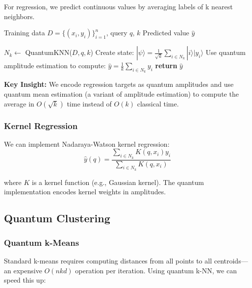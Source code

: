 \documentclass[11pt]{article}
\begin{document}
For regression, we predict continuous values by averaging labels of k nearest neighbors.

\begin{algorithm}
\caption{Quantum k-NN Regression}
\begin{algorithmic}[1]
\REQUIRE Training data $D = \{(x_i, y_i)\}_{i=1}^n$, query $q$, $k$
\ENSURE Predicted value $\hat{y}$

\STATE $N_k \leftarrow$ QuantumKNN($D, q, k$)
\STATE Create state: $|\psi\rangle = \frac{1}{\sqrt{k}} \sum_{i \in N_k} |i\rangle |y_i\rangle$
\STATE Use quantum amplitude estimation to compute:
\STATE $\hat{y} = \frac{1}{k} \sum_{i \in N_k} y_i$
\STATE \textbf{return} $\hat{y}$
\end{algorithmic}
\end{algorithm}

\textbf{Key Insight:} We encode regression targets as quantum amplitudes and use quantum mean estimation (a variant of amplitude estimation) to compute the average in $O(\sqrt{k})$ time instead of $O(k)$ classical time.

\subsubsection{Kernel Regression}

We can implement Nadaraya-Watson kernel regression:
\begin{equation}
\hat{y}(q) = \frac{\sum_{i \in N_k} K(q, x_i) y_i}{\sum_{i \in N_k} K(q, x_i)}
\end{equation}

where $K$ is a kernel function (e.g., Gaussian kernel). The quantum implementation encodes kernel weights in amplitudes.

\subsection{Quantum Clustering}

\subsubsection{Quantum k-Means}

Standard k-means requires computing distances from all points to all centroids---an expensive $O(nkd)$ operation per iteration. Using quantum k-NN, we can speed this up:
\end{document}
